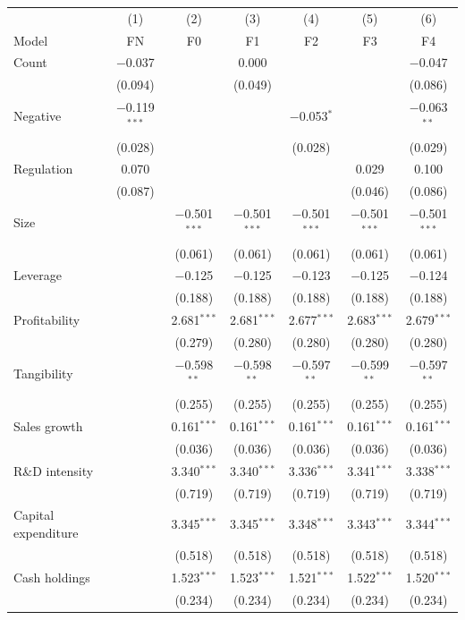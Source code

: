 \begin{tabular}{lcccccc}
\toprule
 & (1) & (2) & (3) & (4) & (5) & (6) \\
Model & FN & F0 & F1 & F2 & F3 & F4 \\
\midrule
Count & $-$0.037 &  & 0.000 &  &  & $-$0.047 \\
 & (0.094) &  & (0.049) &  &  & (0.086) \\
Negative & $-$0.119$^{***}$ &  &  & $-$0.053$^{*}$ &  & $-$0.063$^{**}$ \\
 & (0.028) &  &  & (0.028) &  & (0.029) \\
Regulation & 0.070 &  &  &  & 0.029 & 0.100 \\
 & (0.087) &  &  &  & (0.046) & (0.086) \\
Size &  & $-$0.501$^{***}$ & $-$0.501$^{***}$ & $-$0.501$^{***}$ & $-$0.501$^{***}$ & $-$0.501$^{***}$ \\
 &  & (0.061) & (0.061) & (0.061) & (0.061) & (0.061) \\
Leverage &  & $-$0.125 & $-$0.125 & $-$0.123 & $-$0.125 & $-$0.124 \\
 &  & (0.188) & (0.188) & (0.188) & (0.188) & (0.188) \\
Profitability &  & 2.681$^{***}$ & 2.681$^{***}$ & 2.677$^{***}$ & 2.683$^{***}$ & 2.679$^{***}$ \\
 &  & (0.279) & (0.280) & (0.280) & (0.280) & (0.280) \\
Tangibility &  & $-$0.598$^{**}$ & $-$0.598$^{**}$ & $-$0.597$^{**}$ & $-$0.599$^{**}$ & $-$0.597$^{**}$ \\
 &  & (0.255) & (0.255) & (0.255) & (0.255) & (0.255) \\
Sales growth &  & 0.161$^{***}$ & 0.161$^{***}$ & 0.161$^{***}$ & 0.161$^{***}$ & 0.161$^{***}$ \\
 &  & (0.036) & (0.036) & (0.036) & (0.036) & (0.036) \\
R\&D intensity &  & 3.340$^{***}$ & 3.340$^{***}$ & 3.336$^{***}$ & 3.341$^{***}$ & 3.338$^{***}$ \\
 &  & (0.719) & (0.719) & (0.719) & (0.719) & (0.719) \\
Capital expenditure &  & 3.345$^{***}$ & 3.345$^{***}$ & 3.348$^{***}$ & 3.343$^{***}$ & 3.344$^{***}$ \\
 &  & (0.518) & (0.518) & (0.518) & (0.518) & (0.518) \\
Cash holdings &  & 1.523$^{***}$ & 1.523$^{***}$ & 1.521$^{***}$ & 1.522$^{***}$ & 1.520$^{***}$ \\
 &  & (0.234) & (0.234) & (0.234) & (0.234) & (0.234) \\

\end{tabular}
